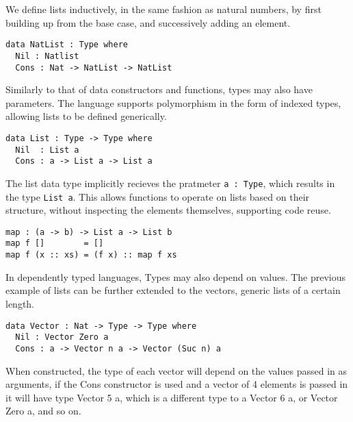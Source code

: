 \documentclass[a4paper]{article}
\begin{document}
We define lists inductively, in the same fashion as natural numbers, by
first building up from the base case, and successively adding an element.

\begin{center}
\begin{verbatim}
data NatList : Type where
  Nil : Natlist
  Cons : Nat -> NatList -> NatList 
\end{verbatim}
\end{center}

Similarly to that of data constructors and functions, types may 
also have parameters. The language supports polymorphism in the form of
indexed types, allowing lists to be defined generically. 

\begin{center}
\begin{verbatim}
data List : Type -> Type where
  Nil  : List a
  Cons : a -> List a -> List a
\end{verbatim}
\end{center}

The list data type implicitly recieves the pratmeter \texttt{a : Type}, which 
results in the type \texttt{List a}. This allows functions to operate on lists
based on their structure, without inspecting the elements themselves,
supporting code reuse. 

\begin{center}
\begin{verbatim}
map : (a -> b) -> List a -> List b
map f []        = []
map f (x :: xs) = (f x) :: map f xs
\end{verbatim}
\end{center}

In dependently typed languages, Types may also depend on values.
The previous example of lists can be further extended to the vectors,
generic lists of a certain length. 

\begin{center}
\begin{verbatim}
data Vector : Nat -> Type -> Type where
  Nil : Vector Zero a
  Cons : a -> Vector n a -> Vector (Suc n) a
\end{verbatim}
\end{center}

When constructed, the type of each vector will depend on the values 
passed in as arguments, if the Cons constructor is used and a vector of 
4 elements is passed in it will have type Vector 5 a, which is a 
different type to a Vector 6 a, or Vector Zero a, and so on. 
\end{document}
